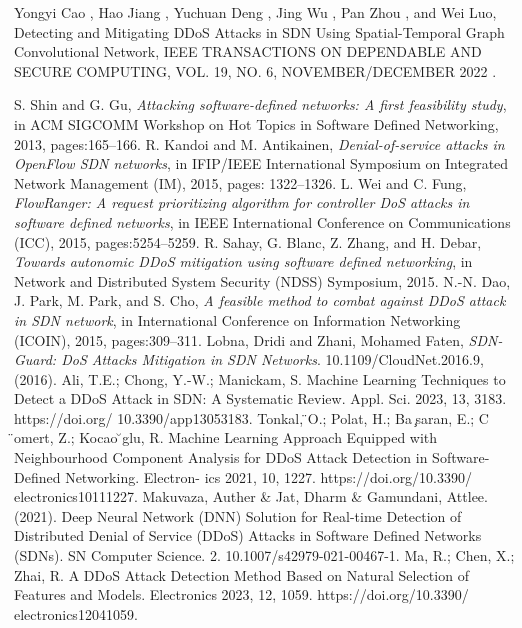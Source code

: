 \begin{thebibliography}{00}
Yongyi Cao , Hao Jiang , Yuchuan Deng , Jing Wu , Pan Zhou , and Wei Luo, Detecting and Mitigating DDoS Attacks in SDN Using Spatial-Temporal Graph Convolutional Network, IEEE TRANSACTIONS ON DEPENDABLE AND SECURE COMPUTING, VOL. 19, NO. 6, NOVEMBER/DECEMBER 2022 .


 S. Shin and G. Gu, \emph{Attacking software-defined networks: A first feasibility study}, in ACM SIGCOMM Workshop on Hot Topics in
Software Defined Networking, 2013, pages:165–166.
 R. Kandoi and M. Antikainen, \emph{Denial-of-service attacks in OpenFlow SDN networks}, in IFIP/IEEE International Symposium on Integrated
Network Management (IM), 2015, pages: 1322–1326.
 L. Wei and C. Fung, \emph{FlowRanger: A request prioritizing algorithm for controller DoS attacks in software defined networks}, in IEEE
International Conference on Communications (ICC), 2015, pages:5254–5259.
R. Sahay, G. Blanc, Z. Zhang, and H. Debar, \emph{Towards autonomic DDoS mitigation using software defined networking}, in Network and
Distributed System Security (NDSS) Symposium, 2015.
N.-N. Dao, J. Park, M. Park, and S. Cho, \emph{A feasible method to combat against DDoS attack in SDN network}, in International Conference on
Information Networking (ICOIN), 2015, pages:309–311.
Lobna, Dridi and Zhani, Mohamed Faten, \emph{SDN-Guard: DoS Attacks Mitigation in SDN Networks}. 10.1109/CloudNet.2016.9, (2016).
Ali, T.E.; Chong, Y.-W.; Manickam, S. Machine Learning Techniques to
Detect a DDoS Attack in SDN: A Systematic Review. Appl. Sci. 2023,
13, 3183. https://doi.org/ 10.3390/app13053183.
 Tonkal,  ̈O.; Polat, H.; Ba ̧saran, E.; C ̈omert, Z.; Kocao  ̆glu, R. Machine
Learning Approach Equipped with Neighbourhood Component Analysis
for DDoS Attack Detection in Software-Defined Networking. Electron-
ics 2021, 10, 1227. https://doi.org/10.3390/ electronics10111227.
 Makuvaza, Auther \& Jat, Dharm \& Gamundani, Attlee. (2021). Deep
Neural Network (DNN) Solution for Real-time Detection of Distributed
Denial of Service (DDoS) Attacks in Software Defined Networks
(SDNs). SN Computer Science. 2. 10.1007/s42979-021-00467-1.
 Ma, R.; Chen, X.; Zhai, R. A DDoS Attack Detection Method Based on
Natural Selection of Features and Models. Electronics 2023, 12, 1059.
https://doi.org/10.3390/ electronics12041059.

\end{thebibliography}
